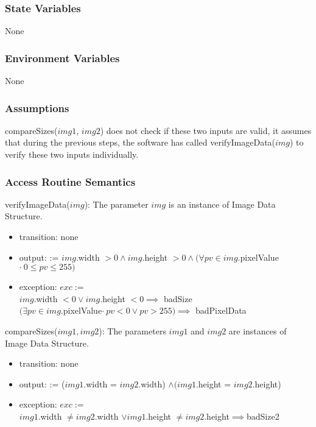 \documentclass[12pt, titlepage]{article}
\begin{document}
\subsubsection{State Variables}

None

\subsubsection{Environment Variables}

None

\subsubsection{Assumptions}

compareSizes($img1$, $img2$) does not check if these two inputs are
valid, it assumes that during the previous steps, the software has called
verifyImageData($img$) to verify these two inputs individually. 

\subsubsection{Access Routine Semantics}

\noindent verifyImageData($img$):
The parameter $img$ is an instance of Image Data Structure.
\begin{itemize}
\item transition: none
\item output: := $img$.width $> 0 \land img$.height $> 0 \land
(\forall pv \in img.$pixelValue$ \cdot\ 0 \le pv \le 255)$
\item exception: $exc :=$\\
$img$.width $< 0 \lor img$.height $< 0 \implies$ badSize\\
$(\exists pv \in img.$pixelValue$ \cdot\ pv < 0 \lor pv > 255) \implies$
badPixelData
\end{itemize}

\noindent compareSizes($img1, img2$):
The parameters $img1$ and $img2$ are instances of Image Data Structure.
\begin{itemize}
\item transition: none
\item output: := ($img1$.width = $img2$.width) $\land (img1$.height =
$img2$.height)
\item exception: $exc :=$\\
$img1$.width $\not= img2$.width $\lor img1$.height $\not=
img2$.height$\implies$badSize2\\
\end{itemize}
\end{document}
